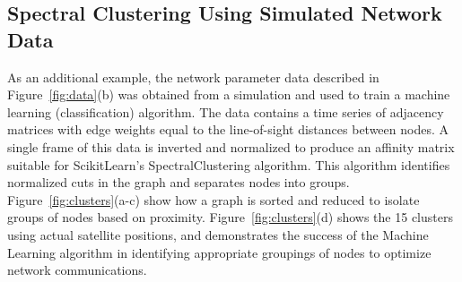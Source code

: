 \documentclass[conference]{IEEEtran}
\begin{document}
\subsection{Spectral Clustering Using Simulated Network Data}
\label{ssec:cluster}

As an additional example, the network parameter data described in Figure~\ref{fig:data}(b) was obtained
from a simulation and used to train a machine learning (classification) algorithm.  The
data contains a time series of adjacency matrices with edge weights equal to the
line-of-sight distances between nodes.  A single frame of this data is inverted
and normalized to produce an affinity matrix suitable for ScikitLearn's
SpectralClustering algorithm.  This algorithm identifies normalized cuts in the
graph and separates nodes into groups.  Figure~\ref{fig:clusters}(a-c) show how
a graph is sorted and reduced to isolate groups of nodes based on proximity.
Figure~\ref{fig:clusters}(d) shows the 15 clusters using actual satellite
positions, and demonstrates the success of the Machine Learning algorithm in
identifying appropriate groupings of nodes to optimize network communications.
\end{document}
